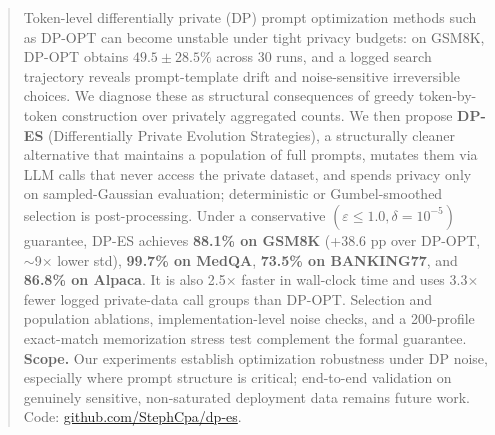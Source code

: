 \begin{abstract}
Token-level differentially private (DP) prompt optimization methods such as DP-OPT can become unstable under tight privacy budgets: on GSM8K, DP-OPT obtains $49.5{\pm}28.5\%$ across 30 runs, and a logged search trajectory reveals prompt-template drift and noise-sensitive irreversible choices. We diagnose these as structural consequences of greedy token-by-token construction over privately aggregated counts. We then propose \textbf{DP-ES} (Differentially Private Evolution Strategies), a structurally cleaner alternative that maintains a population of full prompts, mutates them via LLM calls that never access the private dataset, and spends privacy only on sampled-Gaussian evaluation; deterministic or Gumbel-smoothed selection is post-processing. Under a conservative $(\varepsilon{\leq}1.0, \delta{=}10^{-5})$ guarantee, DP-ES achieves \textbf{88.1\% on GSM8K} (+38.6 pp over DP-OPT, $\sim$9$\times$ lower std), \textbf{99.7\% on MedQA}, \textbf{73.5\% on BANKING77}, and \textbf{86.8\% on Alpaca}. It is also 2.5$\times$ faster in wall-clock time and uses 3.3$\times$ fewer logged private-data call groups than DP-OPT. Selection and population ablations, implementation-level noise checks, and a 200-profile exact-match memorization stress test complement the formal guarantee. \textbf{Scope.} Our experiments establish optimization robustness under DP noise, especially where prompt structure is critical; end-to-end validation on genuinely sensitive, non-saturated deployment data remains future work. Code: \href{https://github.com/StephCpa/dp-es}{github.com/StephCpa/dp-es}.
\end{abstract}
